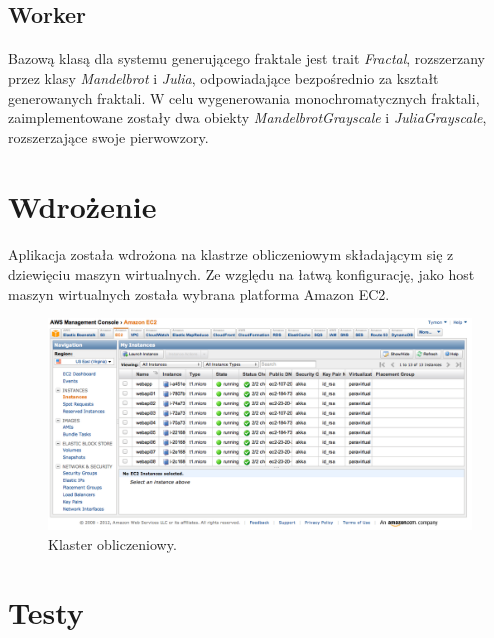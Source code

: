 \documentclass[wide,a4paper,titlepage,12pt]{article}
\begin{document}



\subsection{Worker}
\paragraph{}
Bazową klasą dla systemu generującego fraktale jest trait \textit{Fractal}, rozszerzany przez klasy 
\textit{Mandelbrot} i \textit{Julia}, odpowiadające bezpośrednio za kształt generowanych fraktali. W celu 
wygenerowania monochromatycznych fraktali, zaimplementowane zostały dwa obiekty \textit{MandelbrotGrayscale} 
i \textit{JuliaGrayscale}, rozszerzające swoje pierwowzory.



\section{Wdrożenie}
\paragraph{}
Aplikacja została wdrożona na klastrze obliczeniowym składającym się z
dziewięciu maszyn wirtualnych. Ze względu na łatwą konfigurację, jako host
maszyn wirtualnych została wybrana platforma Amazon EC2.

\begin{figure}[h!]
\begin{center}
\includegraphics[scale=0.33]{ec2.png}
\end{center}
\caption{Klaster obliczeniowy.}
\label{fig:ec2}
\end{figure}


\newpage

\section{Testy}
\end{document}
